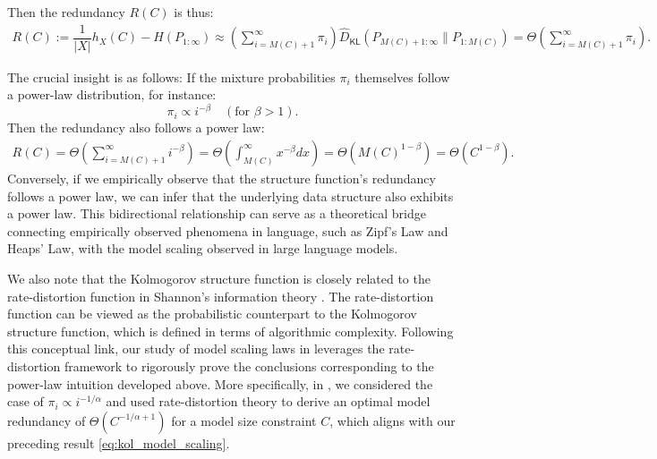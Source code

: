 \documentclass[11pt]{article}
\theoremstyle{plain}
\theoremstyle{definition}
\newcommand{\KLrate}{\hat{D}_{\mathsf{KL}}}
\begin{document}
Then the redundancy $R(C)$ is thus:
\begin{align*}
    R(C):=\dfrac{1}{|X|}h_X(C)-H(P_{1:\infty})\approx \left(\sum\limits_{i=M(C)+1}^{\infty}\pi_i\right)\KLrate\left(P_{M(C)+1:\infty}\|P_{1:M(C)}\right) = \Theta\left(\sum\limits_{i=M(C)+1}^{\infty}\pi_i\right).
\end{align*}




The crucial insight is as follows: If the mixture probabilities \(\pi_i\) themselves follow a power-law distribution, for instance:
\[
\pi_i \propto i^{-\beta} \quad (\text{for } \beta > 1).
\]
Then the redundancy also follows a power law:
\begin{align}
\label{eq:kol_model_scaling}
    R(C)=\Theta\left(\sum_{i=M(C)+1}^{\infty} i^{-\beta} \right) = \Theta\left(\int_{M(C)}^\infty x^{-\beta} dx \right)= \Theta\left(M(C)^{1-\beta}\right)=\Theta\left(C^{1-\beta}\right).
\end{align}
Conversely, if we empirically observe that the structure function's redundancy follows a power law, we can infer that the underlying data structure also exhibits a power law. This bidirectional relationship can serve as a theoretical bridge connecting empirically observed phenomena in language, such as Zipf's Law and Heaps' Law, with the model scaling observed in large language models. 

We also note that the Kolmogorov structure function is closely related to the rate-distortion function in Shannon's information theory \cite{grunwald2003kolmogorov}. The rate-distortion function can be viewed as the probabilistic counterpart to the Kolmogorov structure function, which is defined in terms of algorithmic complexity. Following this conceptual link, our study of model scaling laws in  leverages the rate-distortion framework to rigorously prove the conclusions corresponding to the power-law intuition developed above. More specifically, in , we considered the case of $\pi_i \propto i^{-1/\alpha}$ and used rate-distortion theory to derive an optimal model redundancy of $\Theta(C^{-1/\alpha + 1})$ for a model size constraint $C$, which aligns with our preceding result \eqref{eq:kol_model_scaling}. 





\end{document}
